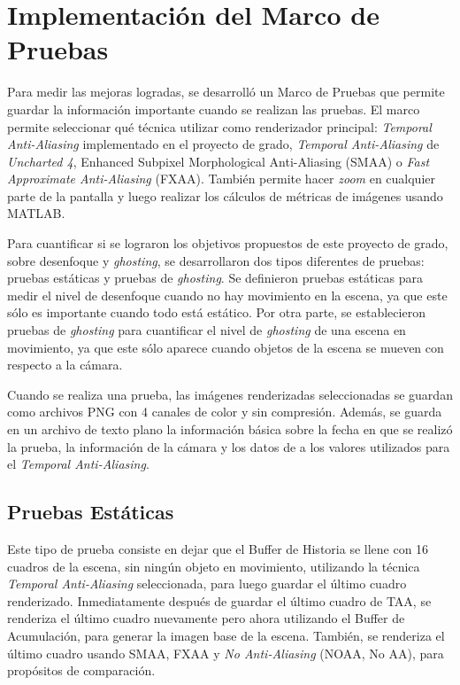 \documentclass[pregrado]{tesis-usb} %
\begin{document}
\section{Implementación del Marco de Pruebas}
Para medir las mejoras logradas, se desarrolló un Marco de Pruebas que permite guardar la información importante cuando se realizan las pruebas. El marco permite seleccionar qué técnica utilizar como renderizador principal: \textit{Temporal Anti-Aliasing} implementado en el proyecto de grado, \textit{Temporal Anti-Aliasing} de \textit{Uncharted 4},  Enhanced Subpixel Morphological Anti-Aliasing (SMAA) o \textit{Fast Approximate Anti-Aliasing} (FXAA). También permite hacer \textit{zoom} en cualquier parte de la pantalla y luego realizar los cálculos de métricas de imágenes usando MATLAB.

Para cuantificar si se lograron los objetivos propuestos de este proyecto de grado, sobre desenfoque y \textit{ghosting}, se desarrollaron dos tipos diferentes de pruebas: pruebas estáticas y pruebas de \textit{ghosting}. Se definieron pruebas estáticas para medir el nivel de desenfoque cuando no hay movimiento en la escena, ya que este sólo es importante cuando todo está estático. Por otra parte, se establecieron pruebas de \textit{ghosting} para cuantificar el nivel de \textit{ghosting} de una escena en movimiento, ya que este sólo aparece cuando objetos de la escena se mueven con respecto a la cámara. 

Cuando se realiza una prueba, las imágenes renderizadas seleccionadas se guardan como archivos PNG con 4 canales de color y sin compresión. Además, se guarda en un archivo de texto plano la información básica sobre la fecha en que se realizó la prueba, la información de la cámara y los datos de a los valores utilizados para el \textit{Temporal Anti-Aliasing}.


\subsection{Pruebas Estáticas}
Este tipo de prueba consiste en dejar que el Buffer de Historia se llene con 16 cuadros de la escena, sin ningún objeto en movimiento, utilizando la técnica \textit{Temporal Anti-Aliasing} seleccionada, para luego guardar el último cuadro renderizado. Inmediatamente después de guardar el último cuadro de TAA, se renderiza el último cuadro nuevamente pero ahora utilizando el Buffer de Acumulación, para generar la imagen base de la escena. También, se renderiza el último cuadro usando SMAA, FXAA y \textit{No Anti-Aliasing} (NOAA, No AA), para propósitos de comparación.
\end{document}
